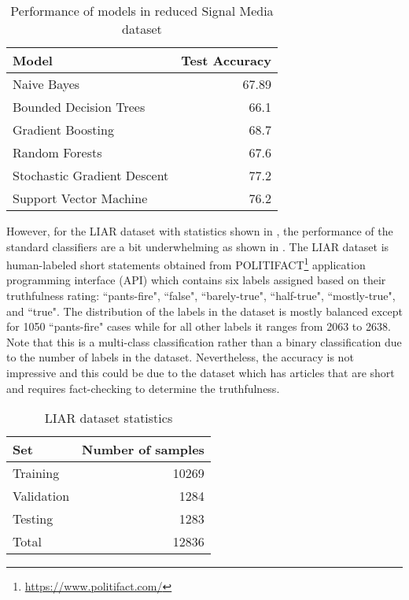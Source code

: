 \begin{table}[h]
\begin{center}
\caption{Performance of models in reduced Signal Media dataset}
\label{tbl:signal_media_performance}
\begin{tabular}{lr}
\toprule 
Model&Test Accuracy\\
\midrule 
Naive Bayes&67.89\\
Bounded Decision Trees&66.1\\
Gradient Boosting&68.7\\
Random Forests&67.6\\
Stochastic Gradient Descent&77.2\\
Support Vector Machine&76.2\\
\bottomrule
\end{tabular}
\end{center}
\end{table}

However, for the LIAR\cite{wang2017liar} dataset with statistics shown in , the performance of the standard classifiers are a bit underwhelming as shown in  \cite{wang2017liar}. The LIAR dataset is human-labeled short statements obtained from POLITIFACT\footnote{\url{https://www.politifact.com/}} application programming interface (API) which contains six labels assigned based on their truthfulness rating: ``pants-fire", ``false", ``barely-true", ``half-true", ``mostly-true", and ``true". The distribution of the labels in the dataset is mostly balanced except for 1050 ``pants-fire" cases while for all other labels it ranges from 2063 to 2638. Note that this is a multi-class classification rather than a binary classification due to the number of labels in the dataset. Nevertheless, the accuracy is not impressive and this could be due to the dataset
which has articles that are short and requires fact-checking to determine the truthfulness.

\begin{table}[h]
\begin{center}
\caption{LIAR dataset statistics}
\label{tbl:liar_statistics}
\begin{tabular}{lr}
\toprule 
Set & Number of samples \\
\midrule 
Training & 10269 \\
Validation & 1284 \\
Testing & 1283 \\
\bottomrule
Total & 12836
\end{tabular}
\end{center}
\end{table}


